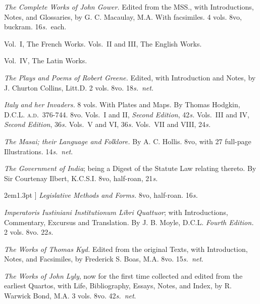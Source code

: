 \documentclass[12pt,oneside]{book}[2021/10/04]
\newcommand{\longdash}{\rule[.5ex]{2em}{1.3pt}
}
\newenvironment{advlist}{
  \begin{description}[leftmargin=1em, parsep=0.2ex, listparindent=1em,]
}{\end{description}}
\newenvironment{vollist}{
\begin{description}[nosep, topsep=-1ex, itemindent=-1em, leftmargin=2em]
}{\end{description}}
\newcommand{\¬}{\hphantom{0}}
\begin{document}
\begin{advlist}
\item[Gower.] \textit{The Complete Works
of John Gower.} Edited from the
MSS., with Introductions, Notes,
and Glossaries, by G. C. Macaulay,
M.A. With facsimiles. 4 vols. 8vo,
buckram. 16\textit{s.}\ each.
\begin{vollist}
\item Vol.\ I, The French Works. Vols.\
II and III, The English Works.
\item Vol.\ IV, The Latin Works.
\end{vollist}

\item[Greene.] \textit{The Plays and Poems
of Robert Greene.} Edited, with Introduction
and Notes, by J. Churton
Collins, Litt.D. 2 vols. 8vo. 18\textit{s.}\ \textit{net}.

\item[Hodgkin.] \textit{Italy and her Invaders.}
8 vols. With Plates and
Maps. By Thomas Hodgkin, D.C.L.
\textsc{a.d.}\ 376-744. 8vo. Vols.\ I and II,
\textit{Second Edition}, 42\textit{s.} Vols.\ III and
IV, \textit{Second Edition}, 36\textit{s.} Vols.\ V and
VI, 36\textit{s.} Vols.\ VII and VIII, 24\textit{s.}

\item[Hollis.] \textit{The Masai; their
Language and Folklore.} By A. C.
Hollis. 8vo, with 27 full-page
Illustrations. 14\textit{s.}\ \textit{net}.

\item[Ilbert.] \textit{The Government of
India}; being a Digest of the Statute
Law relating thereto. By Sir
Courtenay Ilbert, K.C.S.I. 8vo,
half-roan, 21\textit{s.}

\item[\longdash] \textit{Legislative Methods and
Forms.} 8vo, half-roan. 16\textit{s.}

\item[Justinian.] \textit{Imperatoris Iustiniani
Institutionum Libri Quattuor};
with Introductions, Commentary,
Excursus and Translation. By J. B.
Moyle, D.C.L. \textit{Fourth Edition.} 2 vols.
8vo. 22\textit{s.}

\item[Kyd.] \textit{The Works of Thomas
Kyd.} Edited from the original
Texts, with Introduction, Notes,
and Facsimiles, by Frederick S.
Boas, M.A. 8vo. 15\textit{s.}\ \textit{net}.

\item[Lyly.] \textit{The Works of John
Lyly}, now for the first time collected
and edited from the earliest Quartos,
with Life, Bibliography, Essays,
Notes, and Index, by R. Warwick
Bond, M.A. 3 vols. 8vo. 42\textit{s.}\ \textit{net}.


\end{advlist}
\end{document}

